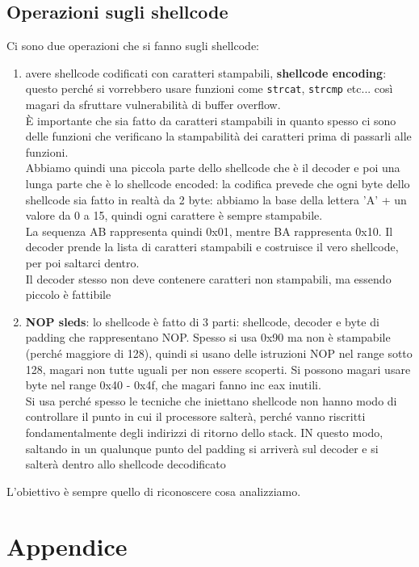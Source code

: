 \documentclass[12pt, oneside]{extbook}
\begin{document}
\section{Operazioni sugli shellcode}
Ci sono due operazioni che si fanno sugli shellcode:
\begin{enumerate}
	\item avere shellcode codificati con caratteri stampabili, \textbf{shellcode encoding}: questo perché si vorrebbero usare funzioni come \texttt{strcat}, \texttt{strcmp} etc... così magari da sfruttare vulnerabilità di buffer overflow.\\È importante che sia fatto da caratteri stampabili in quanto spesso ci sono delle funzioni che verificano la stampabilità dei caratteri prima di passarli alle funzioni.\\Abbiamo quindi una piccola parte dello shellcode che è il decoder e poi una lunga parte che è lo shellcode encoded: la codifica prevede che ogni byte dello shellcode sia fatto in realtà da 2 byte: abbiamo la base della lettera 'A' + un valore da 0 a 15, quindi ogni carattere è sempre stampabile.\\La sequenza AB rappresenta quindi 0x01, mentre BA rappresenta 0x10. Il decoder prende la lista di caratteri stampabili e costruisce il vero shellcode, per poi saltarci dentro.\\Il decoder stesso non deve contenere caratteri non stampabili, ma essendo piccolo è fattibile
	\item \textbf{NOP sleds}: lo shellcode è fatto di 3 parti: shellcode, decoder e byte di padding che rappresentano NOP. Spesso si usa 0x90 ma non è stampabile (perché maggiore di 128), quindi si usano delle istruzioni NOP nel range sotto 128, magari non tutte uguali per non essere scoperti. Si possono magari usare byte nel range 0x40 - 0x4f, che magari fanno inc eax inutili.\\Si usa perché spesso le tecniche che iniettano shellcode non hanno modo di controllare il punto in cui il processore salterà, perché vanno riscritti fondamentalmente degli indirizzi di ritorno dello stack. IN questo modo, saltando in un qualunque punto del padding si arriverà sul decoder e si salterà dentro allo shellcode decodificato
\end{enumerate}
L'obiettivo è sempre quello di riconoscere cosa analizziamo.

\newpage
\chapter*{Appendice}
\end{document}
